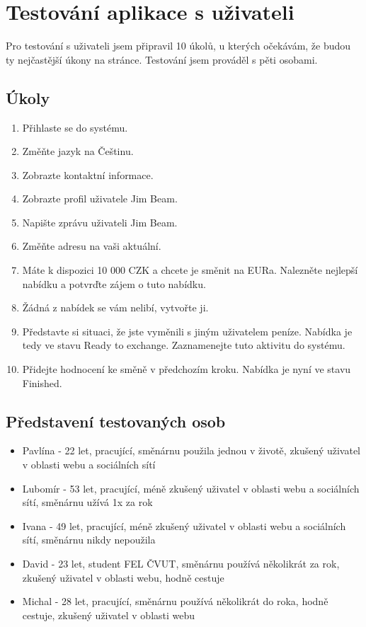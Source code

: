 \section{Testování aplikace s uživateli}
Pro testování s uživateli jsem připravil 10 úkolů, u kterých očekávám, že budou ty nejčastější úkony na stránce. Testování jsem prováděl s pěti osobami.
\subsection{Úkoly}

\begin{enumerate}
    \item Přihlaste se do systému.
    \item Změňte jazyk na Češtinu.
    \item Zobrazte kontaktní informace.
    \item Zobrazte profil uživatele Jim Beam.
    \item Napište zprávu uživateli Jim Beam.
    \item Změňte adresu na vaši aktuální.
    \item Máte k dispozici 10 000 CZK a chcete je směnit na EURa. Nalezněte nejlepší nabídku a potvrďte zájem o tuto nabídku.
    \item Žádná z nabídek se vám nelibí, vytvořte ji.
    \item Představte si situaci, že jste vyměnili s jiným uživatelem peníze. Nabídka je tedy ve stavu Ready to exchange. Zaznamenejte tuto aktivitu do systému.
    \item Přidejte hodnocení ke směně v předchozím kroku. Nabídka je nyní ve stavu Finished.
\end{enumerate}

\subsection{Představení testovaných osob}

\begin{itemize}
    \item Pavlína - 22 let, pracující, směnárnu použila jednou v životě, zkušený uživatel v oblasti webu a sociálních sítí
    \item Lubomír - 53 let, pracující, méně zkušený uživatel v oblasti webu a sociálních sítí, směnárnu užívá 1x za rok
    \item Ivana - 49 let, pracující, méně zkušený uživatel v oblasti webu a sociálních sítí, směnárnu nikdy nepoužila
    \item David - 23 let, student FEL ČVUT, směnárnu používá několikrát za rok, zkušený uživatel v oblasti webu, hodně cestuje
    \item Michal - 28 let, pracující, směnárnu používá několikrát do roka, hodně cestuje, zkušený uživatel v oblasti webu
\end{itemize}

